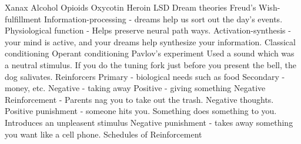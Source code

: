 {}\markdownRendererUlBeginTight
\markdownRendererUlItem Xanax\markdownRendererUlItemEnd 
\markdownRendererUlItem Alcohol\markdownRendererUlItemEnd 
\markdownRendererUlItem Opioids\markdownRendererUlItemEnd 
\markdownRendererUlItem Oxycotin\markdownRendererUlItemEnd 
\markdownRendererUlItem Heroin\markdownRendererUlItemEnd 
\markdownRendererUlItem LSD\markdownRendererUlItemEnd 
\markdownRendererUlEndTight \markdownRendererUlItemEnd 
\markdownRendererUlItem Dream theories\markdownRendererInterblockSeparator
{}\markdownRendererUlBeginTight
\markdownRendererUlItem Freud's Wish-fulfillment\markdownRendererUlItemEnd 
\markdownRendererUlItem Information-processing - dreams help us sort out the day's events.\markdownRendererUlItemEnd 
\markdownRendererUlItem Physiological function - Helps preserve neural path ways.\markdownRendererUlItemEnd 
\markdownRendererUlItem Activation-synthesis - your mind is active, and your dreams help synthesize your information.\markdownRendererUlItemEnd 
\markdownRendererUlEndTight \markdownRendererUlItemEnd 
\markdownRendererUlEnd \markdownRendererInterblockSeparator
{}\markdownRendererInterblockSeparator
{}\markdownRendererUlBeginTight
\markdownRendererUlItem Classical conditioning\markdownRendererUlItemEnd 
\markdownRendererUlItem Operant conditioning\markdownRendererUlItemEnd 
\markdownRendererUlItem Pavlov's experiment\markdownRendererInterblockSeparator
{}\markdownRendererUlBeginTight
\markdownRendererUlItem Used a sound which was a neutral stimulus. If you do the tuning fork just before you present the bell, the dog salivates.\markdownRendererUlItemEnd 
\markdownRendererUlEndTight \markdownRendererUlItemEnd 
\markdownRendererUlItem Reinforcers\markdownRendererInterblockSeparator
{}\markdownRendererUlBeginTight
\markdownRendererUlItem Primary - biological needs such as food\markdownRendererUlItemEnd 
\markdownRendererUlItem Secondary - money, etc.\markdownRendererUlItemEnd 
\markdownRendererUlEndTight \markdownRendererUlItemEnd 
\markdownRendererUlItem Negative - taking away\markdownRendererUlItemEnd 
\markdownRendererUlItem Positive - giving something\markdownRendererUlItemEnd 
\markdownRendererUlItem Negative Reinforcement - Parents nag you to take out the trash. Negative thoughts.\markdownRendererUlItemEnd 
\markdownRendererUlItem Positive punishment - someone hits you. Something does something to you. Introduces an unpleasent stimulus\markdownRendererUlItemEnd 
\markdownRendererUlItem Negative punishment - takes away something you want like a cell phone.\markdownRendererUlItemEnd 
\markdownRendererUlItem Schedules of Reinforcement\markdownRendererInterblockSeparator
